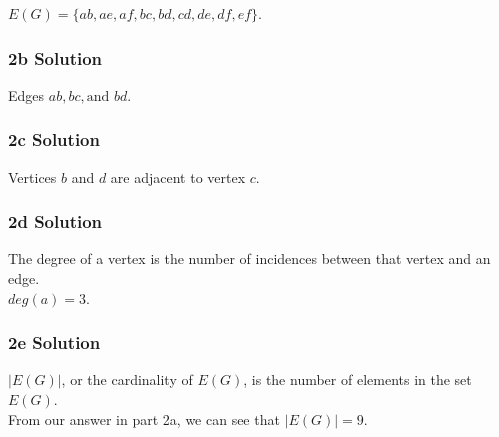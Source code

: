 \documentclass[]{article}
\begin{document}
\begin{center}
$E(G) = \{ab, ae, af, bc, bd, cd, de, df, ef\}$.
\end{center}

\hypertarget{b-solution-1}{%
\subsubsection{2b Solution}\label{b-solution-1}}

Edges \(ab, bc, \text{and } bd\).

\hypertarget{c-solution}{%
\subsubsection{2c Solution}\label{c-solution}}

Vertices \(b\) and \(d\) are adjacent to vertex \(c\).

\hypertarget{d-solution}{%
\subsubsection{2d Solution}\label{d-solution}}

The degree of a vertex is the number of incidences between that vertex
and an edge.\\
\(deg(a) = 3\).

\hypertarget{e-solution}{%
\subsubsection{2e Solution}\label{e-solution}}

\(|E(G)|\), or the cardinality of \(E(G)\), is the number of elements in
the set \(E(G)\).\\
From our answer in part 2a, we can see that \(|E(G)| = 9\).
\end{document}
